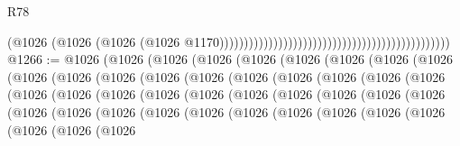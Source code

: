 \begin{lexlean}{R78}
\begin{coremodule}
                                                                                          (@1026
                                                                                            (@1026
                                                                                              (@1026
                                                                                                (@1026
                                                                                                  @1170)))))))))))))))))))))))))))))))))))))))))))))))
@1266 := @1026
    (@1026
      (@1026
        (@1026
          (@1026
            (@1026
              (@1026
                (@1026
                  (@1026
                    (@1026
                      (@1026
                        (@1026
                          (@1026
                            (@1026
                              (@1026
                                (@1026
                                  (@1026
                                    (@1026
                                      (@1026
                                        (@1026
                                          (@1026
                                            (@1026
                                              (@1026
                                                (@1026
                                                  (@1026
                                                    (@1026
                                                      (@1026
                                                        (@1026
                                                          (@1026
                                                            (@1026
                                                              (@1026
                                                                (@1026
                                                                  (@1026
                                                                    (@1026
                                                                      (@1026
                                                                        (@1026
                                                                          (@1026
                                                                            (@1026
                                                                              (@1026
                                                                                (@1026
                                                                                  (@1026
                                                                                    (@1026

\end{coremodule}
\end{lexlean}
